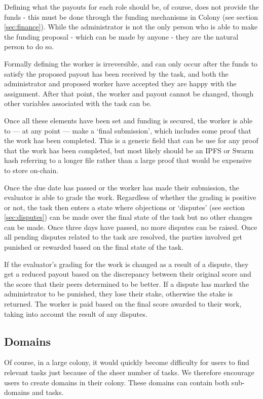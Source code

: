 Defining what the payouts for each role should be, of course, does not provide the funds - this must be done through the funding mechanisms in Colony (see section \ref{sec:finance}). While the administrator is not the only person who is able to make the funding proposal - which can be made by anyone - they are the natural person to do so.

Formally defining the worker is irreversible, and can only occur after the funds to satisfy the proposed payout has been received by the task, and both the administrator and proposed worker have accepted they are happy with the assignment. After that point, the worker and payout cannot be changed, though other variables associated with the task can be.

Once all these elements have been set and funding is secured, the worker is able to --- at any point --- make a ‘final submission’, which includes some proof that the work has been completed. This is a generic field that can be use for any proof that the work has been completed, but most likely should be an IPFS or Swarm hash referring to a longer file rather than a large proof that would be expensive to store on-chain.

Once the due date has passed or the worker has made their submission, the evaluator is able to grade the work. Regardless of whether the grading is positive or not, the task then enters a state where objections or `disputes' (see section \ref{sec:disputes}) can be made over the final state of the task but no other changes can be made. Once three days have passed, no more disputes can be raised. Once all pending disputes related to the task are resolved, the parties involved get punished or rewarded based on the final state of the task.

If the evaluator’s grading for the work is changed as a result of a dispute, they get a reduced payout based on the discrepancy between their original score and the score that their peers determined to be better. If a dispute has marked the administrator to be punished, they lose their stake, otherwise the stake is returned. The worker is paid based on the final score awarded to their work, taking into account the result of any disputes.

\subsection{Domains}\label{sec:domains}

Of course, in a large colony, it would quickly become difficulty for users to find relevant tasks just because of the sheer number of tasks. We therefore encourage users to create domains in their colony. These domains can contain both sub-domains and tasks. 

